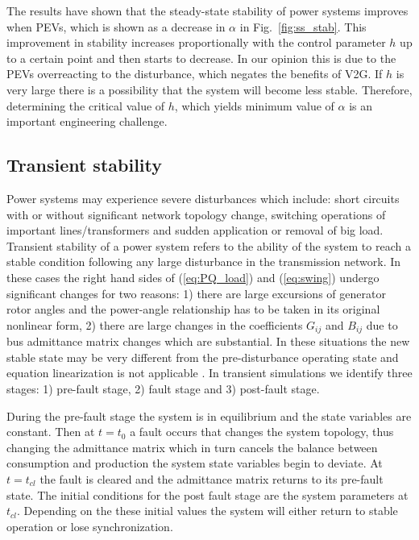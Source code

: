 \documentclass[final,12pt]{elsarticle}
\begin{document}
The results have shown that the steady-state stability of power systems improves
when PEVs, which is shown as a decrease in $\alpha$ in Fig.~\ref{fig:ss_stab}.
This improvement in stability increases proportionally with the
control parameter $h$ up to a certain point and then starts to decrease.
In our opinion this is due to the PEVs
overreacting to the disturbance, which negates the benefits of V2G. If $h$
is very large there is a possibility that the system will become less stable.
Therefore, determining the critical value of $h$, which yields minimum
value of $\alpha$ is an important engineering challenge.

\subsection{Transient stability}
\vspace{10px}

Power systems may experience severe disturbances which include:
short circuits with or without significant network topology change, switching
operations of important lines/transformers and sudden application or removal of
big load. Transient stability of a power system refers to the ability of the
system to reach a stable condition following any large disturbance in the
transmission network. In these cases the right hand sides of (\ref{eq:PQ_load})
and (\ref{eq:swing}) undergo significant changes for two reasons: 1) there are
large excursions of generator rotor angles and the power-angle relationship has
to be taken in its original nonlinear form, 2) there are large changes in the
coefficients $G_{ij}$ and $B_{ij}$ due to bus admittance matrix changes which
are substantial. In these situations the new stable state may be very different
from the pre-disturbance operating state and equation linearization is not
applicable  \cite{machowski2011power}. In transient simulations we identify
three stages: 1) pre-fault stage, 2) fault stage and 3) post-fault stage.


During the pre-fault stage the system is in equilibrium and the state variables
are constant. Then at $t = t_0$ a fault occurs that changes the system topology,
thus changing the admittance matrix which in turn cancels the
balance between consumption and production the system state variables begin to
deviate. At $t = t_{cl}$ the fault is cleared and the
admittance matrix returns to its pre-fault state. The initial conditions for the
post fault stage are the system parameters at $t_{cl}$. Depending on the these
initial values the system will either return to stable operation or lose
synchronization.
\end{document}
